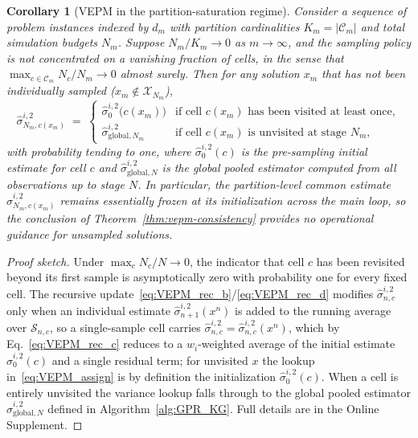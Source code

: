 \documentclass[12pt]{article}
\theoremstyle{plain}
\newtheorem{corollary}{Corollary}[section]
\theoremstyle{definition}
\theoremstyle{remark}
\begin{document}
\begin{corollary}[VEPM in the partition-saturation regime]
\label{cor:partition-saturation}
Consider a sequence of problem instances indexed by $d_{m}$ with partition
cardinalities $K_{m}=|\mathcal{C}_{m}|$ and total simulation budgets
$N_{m}$.  Suppose $N_{m}/K_{m}\to 0$ as $m\to\infty$, and the sampling
policy is not concentrated on a vanishing fraction of cells, in the sense
that $\max_{c\in\mathcal{C}_{m}} N_{c}/N_{m}\to 0$ almost surely.  Then
for any solution $x_{m}$ that has not been individually sampled
($x_{m}\notin\mathcal{X}_{N_{m}}$),
\[
  \hat{\sigma}_{N_{m},c(x_{m})}^{i,2}
  \;=\;
  \begin{cases}
    \hat{\sigma}_{0}^{i,2}\!\bigl(c(x_{m})\bigr) &
      \text{if cell $c(x_{m})$ has been visited at least once},\\[4pt]
    \hat{\sigma}_{\mathrm{global},N_{m}}^{i,2} &
      \text{if cell $c(x_{m})$ is unvisited at stage $N_{m}$,}
  \end{cases}
\]
with probability tending to one, where $\hat{\sigma}_{0}^{i,2}(c)$ is
the pre-sampling initial estimate for cell $c$ and
$\hat{\sigma}_{\mathrm{global},N}^{i,2}$ is the global pooled estimator
computed from all observations up to stage $N$.  In particular, the
partition-level common estimate $\hat{\sigma}_{N_{m},c(x_{m})}^{i,2}$
remains essentially frozen at its initialization across the main loop,
so the conclusion of Theorem~\ref{thm:vepm-consistency} provides no
operational guidance for unsampled solutions.
\end{corollary}

\begin{proof}[Proof sketch]
Under $\max_{c} N_{c}/N\to 0$, the indicator that cell $c$ has been
revisited beyond its first sample is asymptotically zero with probability
one for every fixed cell.  The recursive
update~\eqref{eq:VEPM_rec_b}/\eqref{eq:VEPM_rec_d} modifies
$\hat{\sigma}^{i,2}_{n,c}$ only when an individual estimate
$\hat{\sigma}^{i,2}_{n+1}(x^n)$ is added to the running average over
$\mathcal{S}_{n,c}$, so a single-sample cell carries
$\hat{\sigma}^{i,2}_{n,c}=\hat{\sigma}^{i,2}_{n,c}(x^n)$, which by
Eq.~\eqref{eq:VEPM_rec_c} reduces to a $w_{i}$-weighted average of the
initial estimate $\hat{\sigma}^{i,2}_{0}(c)$ and a single residual term;
for unvisited $x$ the lookup in~\eqref{eq:VEPM_assign} is by definition
the initialization $\hat{\sigma}^{i,2}_{0}(c)$.  When a cell is entirely
unvisited the variance lookup falls through to the global pooled
estimator $\hat{\sigma}_{\mathrm{global},N}^{i,2}$ defined in
Algorithm~\ref{alg:GPR_KG}.  Full details are in the Online Supplement.
\end{proof}
\end{document}

